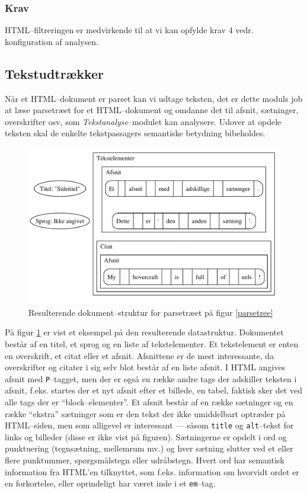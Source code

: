 \documentclass[a4paper,oneside]{memoir}
\begin{document}
\subsubsection*{Krav}
HTML--filtreringen er medvirkende til at vi kan opfylde krav 4
vedr. konfiguration af analysen.

\subsection{Tekstudtrækker}
\label{tekstudtraekkerdesign}
Når et HTML--dokument er parset kan vi udtage teksten, det er dette
moduls job at læse parsetræet for et HTML--dokument og omdanne det til
afsnit, sætninger, overskrifter osv, som \textit{Tekstanalyse}--modulet
kan analysere. Udover at opdele teksten skal de enkelte tekstpassagers
semantiske betydning bibeholdes.

\begin{figure}
  \includegraphics[width=\textwidth]{documentill.pdf}
  \caption{Resulterende dokument--struktur for parsetræet på figur
    \ref{parsetree}}
  \label{dokument}
\end{figure}

På figur \ref{dokument} er vist et eksempel på den resulterende
datastruktur. Dokumentet består af en titel, et sprog og en liste af
tekstelementer. Et tekstelement er enten en overskrift, et citat eller
et afsnit. Afsnittene er de mest interessante, da overskrifter og
citater i sig selv blot består af en liste afsnit. I HTML angives
afsnit med \texttt{P}--tagget, men der er også en række andre tags der
adskiller teksten i afsnit, f.eks. startes der et nyt afsnit efter et
billede, en tabel, faktisk sker det ved alle tags der er
``block--elementer''. Et afsnit består af en række sætninger og en
række ``ekstra'' sætninger som er den tekst der ikke umiddelbart
optræder på HTML--siden, men som alligevel er interessant --- såsom
\texttt{title} og \texttt{alt}--tekst for links og billeder (disse er
ikke vist på figuren). Sætningerne er opdelt i ord og punktuering
(tegnsætning, mellemrum mv.) og hver sætning slutter ved et eller
flere punktummer, spørgsmålstegn eller udråbstegn. Hvert ord har
semantisk information fra HTML'en tilknyttet, som f.eks. information
om hvorvidt ordet er en forkortelse, eller oprindeligt har været inde
i et \texttt{em}--tag.
\end{document}
